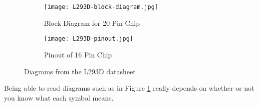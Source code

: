 \documentclass[../TinyBot.tex]{subfiles}
\begin{document}

        
        

\begin{figure}[h]
    \centering

    \begin{subfigure}[t]{0.5\textwidth}
        \texttt{[image: L293D-block-diagram.jpg]}
        \caption{Block Diagram for 20 Pin Chip}
        \label{fig:l293d-block-diagram}
    \end{subfigure}
    \begin{subfigure}[t]{0.3\textwidth}
        \centering
        \texttt{[image: L293D-pinout.jpg]}
        \caption{Pinout of 16 Pin Chip}
        \label{fig:l293d-pinout}
    \end{subfigure}

    \caption{Diagrams from the L293D datasheet}
    \label{fig:l293d}
\end{figure}


\FloatBarrier


Being able to read diagrams such as in Figure \ref{fig:l293d-block-diagram} really depends on whether or not you know what each symbol means. \\

\end{document}
